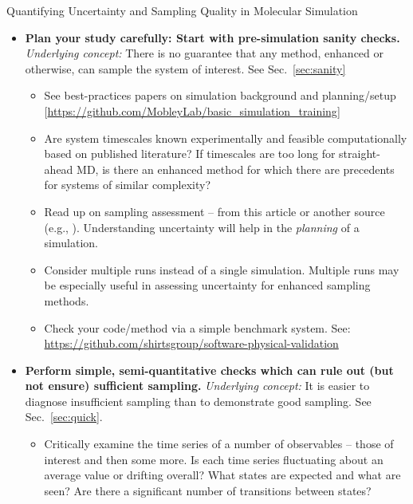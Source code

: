 \documentclass[9pt,bestpractices]{livecoms}
\begin{document}
\begin{Checklists*}[p!]
\begin{checklist}{Quantifying Uncertainty and Sampling Quality in Molecular Simulation}
\begin{itemize}
\item
\textbf{Plan your study carefully: Start with pre-simulation sanity checks.}  \emph{Underlying concept:} There is no guarantee that any method, enhanced or otherwise, can sample the system of interest.  See Sec.\ \ref{sec:sanity}
    \begin{itemize}
    \item See best-practices papers on simulation background and planning/setup [\url{https://github.com/MobleyLab/basic_simulation_training}]
    \item Are system timescales known experimentally and feasible computationally based on published literature?
      If timescales are too long for straight-ahead MD, is there an enhanced method for which there are precedents for systems of similar complexity?
    \item Read up on sampling assessment -- from this article or another source (e.g., \cite{Grossfield2009}).  Understanding uncertainty will help in the \emph{planning} of a simulation.
    \item Consider multiple runs instead of a single simulation.  Multiple runs may be especially useful in assessing uncertainty for enhanced sampling methods.
    \item Check your code/method via a simple benchmark system.  See: \url{https://github.com/shirtsgroup/software-physical-validation}
    \end{itemize}
\item
\textbf{Perform simple, semi-quantitative checks which can rule out (but not ensure) sufficient sampling.} \emph{Underlying concept:} It is easier to diagnose insufficient sampling than to demonstrate good sampling.  See Sec.\ \ref{sec:quick}.
    \begin{itemize}
    \item Critically examine the time series of a number of observables -- those of interest and then some more.  Is each time series fluctuating about an average value or drifting overall?  What states are expected and what are seen?  Are there a significant number of transitions between states?

\end{itemize}
\end{itemize}
\end{checklist}
\end{Checklists*}
\end{document}
